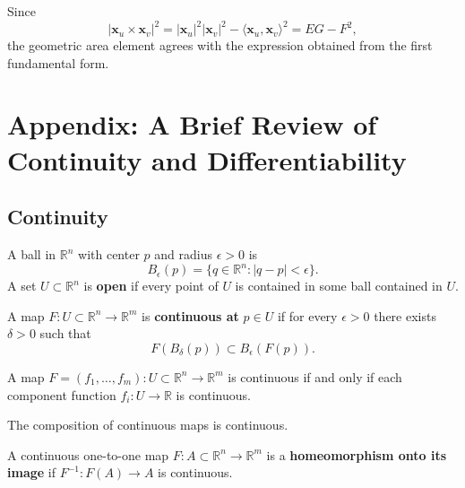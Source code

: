 \documentclass[12pt, oneside]{book}
\begin{document}
\begin{remark}
    Since
    \[
        |\mathbf{x}_u\times \mathbf{x}_v|^2
        =
        |\mathbf{x}_u|^2|\mathbf{x}_v|^2
        -
        \langle \mathbf{x}_u,\mathbf{x}_v\rangle^2
        =
        EG-F^2,
    \]
    the geometric area element agrees with the expression obtained from the
    first fundamental form.
\end{remark}

\section*{Appendix: A Brief Review of Continuity and Differentiability}

\subsection*{Continuity}

\begin{definition}
    A ball in $\mathbb{R}^n$ with center $p$ and radius $\epsilon>0$ is
    \[
        B_\epsilon(p)=\{q\in \mathbb{R}^n:|q-p|<\epsilon\}.
    \]
    A set $U\subset \mathbb{R}^n$ is \textbf{open} if every point of $U$ is
    contained in some ball contained in $U$.
\end{definition}

\begin{definition}
    A map $F:U\subset \mathbb{R}^n\rightarrow \mathbb{R}^m$ is
    \textbf{continuous at} $p\in U$ if for every $\epsilon>0$ there exists
    $\delta>0$ such that
    \[
        F(B_\delta(p))\subset B_\epsilon(F(p)).
    \]
\end{definition}

\begin{proposition}
    A map $F=(f_1,\ldots,f_m):U\subset \mathbb{R}^n\rightarrow
        \mathbb{R}^m$ is continuous if and only if each component function
    $f_i:U\rightarrow \mathbb{R}$ is continuous.
\end{proposition}

\begin{proposition}
    The composition of continuous maps is continuous.
\end{proposition}

\begin{definition}
    A continuous one-to-one map $F:A\subset \mathbb{R}^n\rightarrow
        \mathbb{R}^m$ is a \textbf{homeomorphism onto its image} if
    $F^{-1}:F(A)\rightarrow A$ is continuous.
\end{definition}
\end{document}
